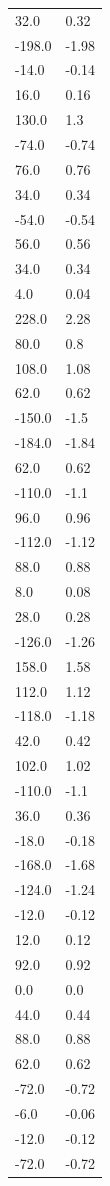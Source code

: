 \begin{longtable}{ll}
32.0 & 0.32 \\
-198.0 & -1.98 \\
-14.0 & -0.14 \\
16.0 & 0.16 \\
130.0 & 1.3 \\
-74.0 & -0.74 \\
76.0 & 0.76 \\
34.0 & 0.34 \\
-54.0 & -0.54 \\
56.0 & 0.56 \\
34.0 & 0.34 \\
4.0 & 0.04 \\
228.0 & 2.28 \\
80.0 & 0.8 \\
108.0 & 1.08 \\
62.0 & 0.62 \\
-150.0 & -1.5 \\
-184.0 & -1.84 \\
62.0 & 0.62 \\
-110.0 & -1.1 \\
96.0 & 0.96 \\
-112.0 & -1.12 \\
88.0 & 0.88 \\
8.0 & 0.08 \\
28.0 & 0.28 \\
-126.0 & -1.26 \\
158.0 & 1.58 \\
112.0 & 1.12 \\
-118.0 & -1.18 \\
42.0 & 0.42 \\
102.0 & 1.02 \\
-110.0 & -1.1 \\
36.0 & 0.36 \\
-18.0 & -0.18 \\
-168.0 & -1.68 \\
-124.0 & -1.24 \\
-12.0 & -0.12 \\
12.0 & 0.12 \\
92.0 & 0.92 \\
0.0 & 0.0 \\
44.0 & 0.44 \\
88.0 & 0.88 \\
62.0 & 0.62 \\
-72.0 & -0.72 \\
-6.0 & -0.06 \\
-12.0 & -0.12 \\
-72.0 & -0.72 \\

\end{longtable}
